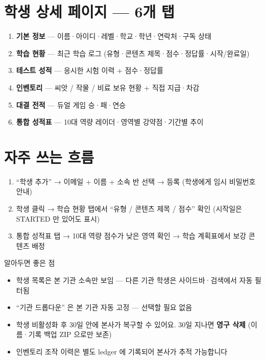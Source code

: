 \section*{학생 상세 페이지 — 6개 탭}
\begin{enumerate}
  \item \textbf{기본 정보} — 이름·아이디·레벨·학교·학년·연락처·구독 상태
  \item \textbf{학습 현황} — 최근 학습 로그 (유형·콘텐츠 제목·점수·정답률·시작/완료일)
  \item \textbf{테스트 성적} — 응시한 시험 이력 + 점수·정답률
  \item \textbf{인벤토리} — 씨앗 / 작물 / 비료 보유 현황 + 직접 지급·차감
  \item \textbf{대결 전적} — 듀얼 게임 승·패·연승
  \item \textbf{통합 성적표} — 10대 역량 레이더·영역별 강약점·기간별 추이
\end{enumerate}

\section*{자주 쓰는 흐름}
\begin{enumerate}
  \item ``학생 추가'' → 이메일 + 이름 + 소속 반 선택 → 등록 (학생에게 임시 비밀번호 안내)
  \item 학생 클릭 → 학습 현황 탭에서 ``유형 / 콘텐츠 제목 / 점수'' 확인 (시작일은 STARTED 만 있어도 표시)
  \item 통합 성적표 탭 → 10대 역량 점수가 낮은 영역 확인 → 학습 계획표에서 보강 콘텐츠 배정
\end{enumerate}

\begin{tipbox}{알아두면 좋은 점}
\begin{itemize}[leftmargin=1.2em]
  \item 학생 목록은 본 기관 소속만 보임 — 다른 기관 학생은 사이드바·검색에서 자동 필터됨
  \item ``기관 드롭다운'' 은 본 기관 자동 고정 — 선택할 필요 없음
  \item 학생 비활성화 후 30일 안에 본사가 복구할 수 있어요. 30일 지나면 \textbf{영구 삭제} (이름·기록 백업 ZIP 으로만 보존)
  \item 인벤토리 조작 이력은 별도 ledger 에 기록되어 본사가 추적 가능합니다
\end{itemize}
\end{tipbox}
